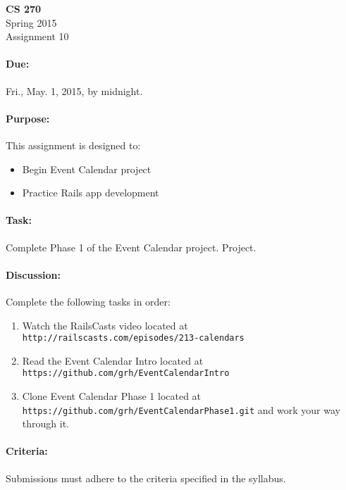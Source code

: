 \documentclass[11pt]{article}
\begin{document}
    \thispagestyle{empty}

    \begin{center}

        \large\textbf{CS 270} \\
        Spring 2015 \\
        Assignment 10 \\

    \end{center}

    \paragraph{Due:} Fri., May. 1, 2015, by midnight.

    \paragraph{Purpose:} This assignment is designed to:

        \begin{itemize}

            \item Begin Event Calendar project

            \item Practice Rails app development

        \end{itemize}

    \paragraph{Task:} Complete Phase 1 of the Event Calendar project.
    Project.
    
    \paragraph{Discussion:} Complete the following tasks in order:

    \begin{enumerate}

        \item Watch the RailsCasts video located at
            \texttt{http://railscasts.com/episodes/213-calendars}

        \item Read the Event Calendar Intro located at
            \texttt{https://github.com/grh/EventCalendarIntro}

        \item Clone Event Calendar Phase 1 located at
            \texttt{https://github.com/grh/EventCalendarPhase1.git} and
            work your way through it.

    \end{enumerate}
    
    \paragraph{Criteria:} Submissions must adhere to the criteria
    specified in the syllabus.
\end{document}
